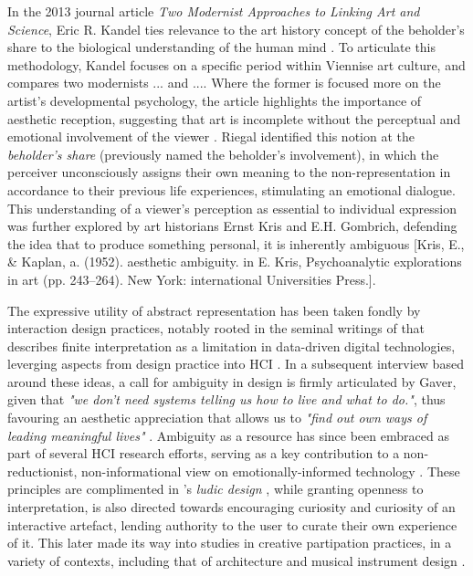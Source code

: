 In the 2013 journal article \textit{Two Modernist Approaches to Linking Art and Science}, Eric R. Kandel ties relevance to the art history concept of the beholder's share to the biological understanding of the human mind \cite{kandel_two_2013}. To articulate this methodology, Kandel focuses on a specific period within Viennise art culture, and compares two modernists ... and .... Where the former is focused more on the artist's developmental psychology, the article highlights the importance of aesthetic reception, suggesting that art is incomplete without the perceptual and emotional involvement of the viewer \cite{riegl_group_1999}. Riegal identified this notion at the \textit{beholder's share} (previously named the beholder's involvement), in which the perceiver unconsciously assigns their own meaning to the non-representation in accordance to their previous life experiences, stimulating an emotional dialogue. This understanding of a viewer's perception as essential to individual expression was further explored by art historians Ernst Kris and E.H. Gombrich, defending the idea that to produce something personal, it is inherently ambiguous [Kris, E., \& Kaplan, a. (1952). aesthetic ambiguity. in E. Kris, Psychoanalytic explorations in art (pp. 243–264). New York: international Universities Press.].


The expressive utility of abstract representation has been taken fondly by interaction design practices, notably rooted in the seminal writings of \citeauthor{gaver_ambiguity_2003} that describes finite interpretation as a limitation in data-driven digital technologies, leverging aspects from design practice into HCI \cite{gaver_ambiguity_2003}. In a subsequent interview based around these ideas, a call for ambiguity in design is firmly articulated by Gaver, given that \textit{"we don’t need systems telling us how to live and what to do."}, thus favouring an aesthetic appreciation that allows us to \textit{"find out own ways of leading meaningful lives"} \cite{gaver_gaffney_2007}. Ambiguity as a resource has since been embraced as part of several HCI research efforts, serving as a key contribution to a non-reductionist, non-informational view on emotionally-informed technology \cite{sanches_ambiguity_2019,stahl_evocative_2014}. These principles are complimented in \citeauthor{gaver_drift_2004}'s \textit{ludic design} \cite{gaver_drift_2004}, while granting openness to interpretation, is also directed towards encouraging curiosity and curiosity of an interactive artefact, lending authority to the user to curate their own experience of it. This later made its way into studies in creative partipation practices, in a variety of contexts, including that of architecture and musical instrument design \cite{harriss_ludic_2010,mcpherson_designing_2016}.

